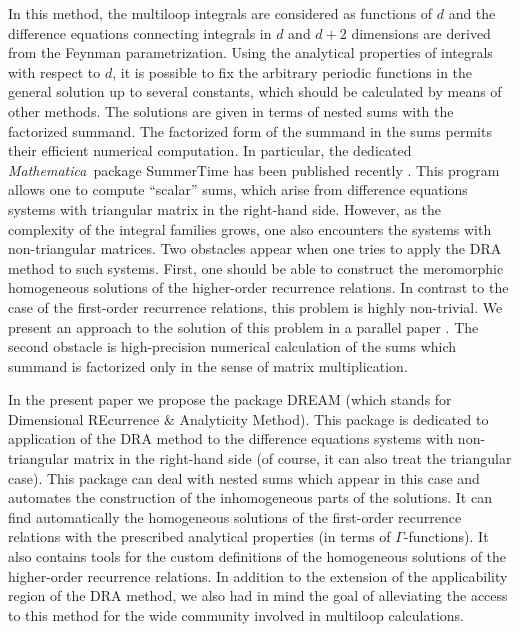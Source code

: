 \documentclass[sort&compress]{elsarticle}
\newcommand{\Mathematica}{\textit{Mathematica}}
\newcommand{\D}{d}
\begin{document}
In this method, the multiloop integrals are considered as functions of $\D$ and the difference equations connecting integrals in $\D$ and $\D+2$ dimensions are derived from the Feynman parametrization.
Using the analytical properties of integrals with respect to $\D$, it is possible to fix the arbitrary periodic functions in the general solution up to several constants, which should be calculated by means of other methods.
The solutions are given in terms of nested sums with the factorized summand.
The factorized form of the summand in the sums permits their efficient numerical computation.
In particular, the dedicated \Mathematica\ package SummerTime has been published recently \cite{LeeMingulov:2016:SummerTime}.
This program allows one to compute ``scalar'' sums, which arise from difference equations systems with triangular matrix in the right-hand side.
However, as the complexity of the integral families grows, one also encounters the systems with non-triangular matrices.
Two obstacles appear when one tries to apply the DRA method to such systems.
First, one should be able to construct the meromorphic homogeneous solutions of the higher-order recurrence relations.
In contrast to the case of the first-order recurrence relations, this problem is highly non-trivial.
We present an approach to the solution of this problem in a parallel paper \cite{LeeMingulov:Meromorphic}.
The second obstacle is high-precision numerical calculation of the sums which summand is factorized only in the sense of matrix multiplication.

In the present paper we propose the package DREAM (which stands for Dimensional REcurrence \& Analyticity Method).
This package is dedicated to application of the DRA method to the difference equations systems with non-triangular matrix in the right-hand side (of course, it can also treat the triangular case).
This package can deal with nested sums which appear in this case and automates the construction of the inhomogeneous parts of the solutions.
It can find automatically the homogeneous solutions of the first-order recurrence relations with the prescribed analytical properties (in terms of $\Gamma$-functions).
It also contains tools for the custom definitions of the homogeneous solutions of the higher-order recurrence relations.
In addition to the extension of the applicability region of the DRA method, we also had in mind the goal of alleviating the access to this method for the wide community involved in multiloop calculations.

\end{document}
